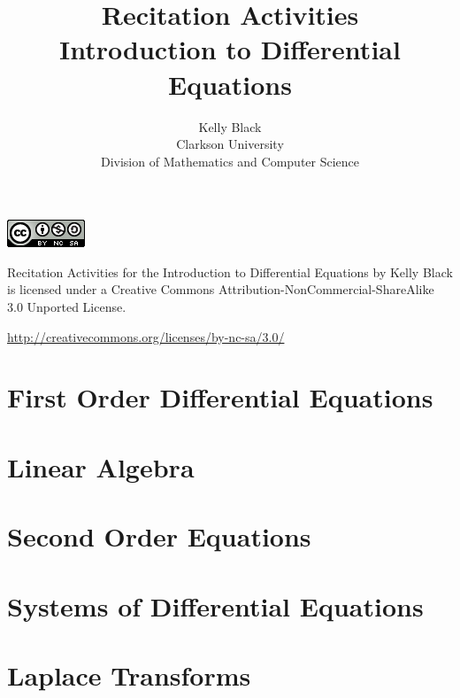 \documentclass[12pt,twoside]{book}
\begin{document}
\title{Recitation Activities \\ 
  Introduction to Differential Equations}
\author{Kelly Black\\Clarkson University\\Division of Mathematics and
  Computer Science}

\maketitle



\begin{center}
  
  \includegraphics{img/ccV3}

  Recitation Activities for the Introduction to Differential Equations
  by Kelly Black is licensed under a Creative Commons
  Attribution-NonCommercial-ShareAlike 3.0 Unported License.

  \url{http://creativecommons.org/licenses/by-nc-sa/3.0/ }

\end{center}

\tableofcontents


\chapter{First Order Differential Equations}


\chapter{Linear Algebra}



\chapter{Second Order Equations}

\chapter{Systems of Differential Equations}

\chapter{Laplace Transforms}

\newcommand{\laplace}[1]{\makebox{$ {\cal L} \{ #1 \}$}}
\newcommand{\invlaplace}[1]{\makebox{$ {\cal L}^{-1} \left\{ #1 \right\}$}}

\end{document}
